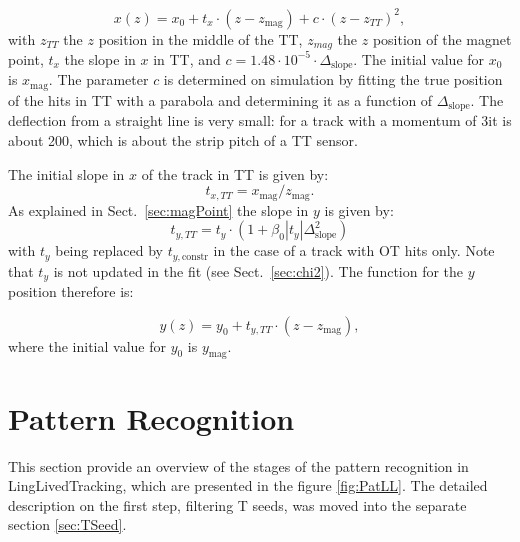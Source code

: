 \begin{equation}
x(z) = x_{0} + t_{x} \cdot (z - z_{\text{mag}}) +c \cdot (z - z_{TT})^{2},
\end{equation}
with $z_{TT}$ the $z$ position in the middle of the TT, $z_{mag}$ the $z$
position of the magnet point, $t_{x} $ the slope in $x$ in TT, and
$c= 1.48\cdot 10^{-5} \cdot \Delta_{\text{slope}}$. The initial value for $x_{0}$ is $x_{\text{mag}}$. 
The parameter $c$ is determined on
simulation by fitting the true position of the hits in TT with a parabola
and determining it as a function of $\Delta_{\text{slope}}$. The deflection from a
straight line is very small: for a track with a momentum of 3\gevc it is about
200\mum, which is about the strip pitch of a TT sensor.

The initial slope in $x$ of the track in TT is given by:
\begin{equation}
t_{x,TT} = x_{\text{mag}}/z_{\text{mag}}.
\end{equation}
As explained in Sect.~\ref{sec:magPoint} the slope in $y$ is given by:
\begin{equation}
t_{y,TT} = t_{y} \cdot (1 + \beta_{0} |t_{y}| \Delta_{\text{slope}}^{2})
\end{equation}
with $t_{y}$ being replaced by $t_{y, \text{constr}}$ in the case of a track with OT
hits only. Note that $t_{y}$ is not updated in the fit (see Sect.~\ref{sec:chi2}). 
The function for the $y$ position therefore is:

\begin{equation}
y(z) = y_{0} + t_{y,TT} \cdot (z - z_{\text{mag}}),
\end{equation}
where the initial value for $y_{0}$ is $y_{\text{mag}}$. 

\section{Pattern Recognition}

This section provide an overview of the stages of the pattern recognition in LingLivedTracking, which are presented in the figure \ref{fig:PatLL}. The detailed description on the first step, filtering T seeds, was moved into the separate section  \ref{sec:TSeed}. 

